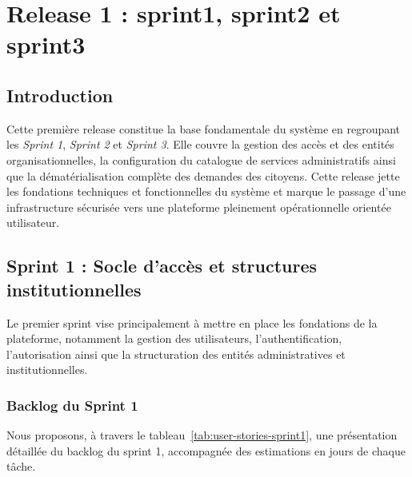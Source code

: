 \chapter{Release 1 : sprint1, sprint2 et sprint3}


\section{Introduction}

Cette première release constitue la base fondamentale du système en regroupant les \textit{Sprint 1}, \textit{Sprint 2} et \textit{Sprint 3}. Elle couvre la gestion des accès et des entités organisationnelles, la configuration du catalogue de services administratifs ainsi que la dématérialisation complète des demandes des citoyens. Cette release jette les fondations techniques et fonctionnelles du système et marque le passage d’une infrastructure sécurisée vers une plateforme pleinement opérationnelle orientée utilisateur.


\section{Sprint 1 : Socle d'accès et structures institutionnelles}

Le premier sprint vise principalement à mettre en place les fondations de la plateforme, notamment la gestion des utilisateurs, l’authentification, l’autorisation ainsi que la structuration des entités administratives et institutionnelles.


\subsection{Backlog du Sprint 1}

Nous proposons, à travers le tableau~\ref{tab:user-stories-sprint1}, une présentation détaillée du backlog du sprint 1, accompagnée des estimations en jours de chaque tâche.



\renewcommand{\arraystretch}{1.3}

